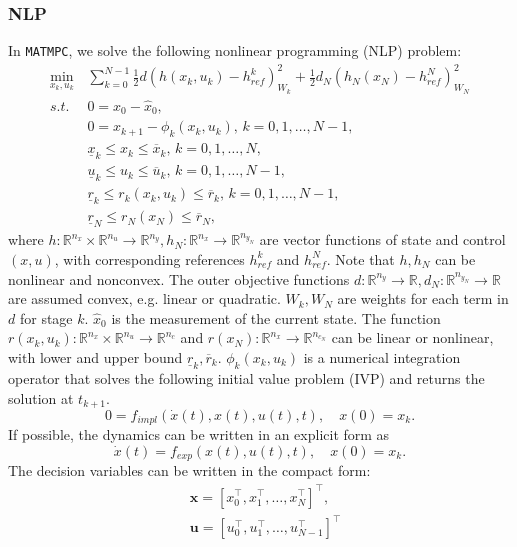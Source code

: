\documentclass{article}
\newcommand{\software}[1]{{\tt#1}}
\begin{document}
\subsubsection{NLP}
In \software{MATMPC}, we solve the following nonlinear programming (NLP) problem:
\begin{equation}\label{NLP}
	\begin{aligned}
	\min_{x_k,u_k} \,&\sum_{k=0}^{N-1} \frac{1}{2}d(h(x_k,u_k)-h_{ref}^k)_{W_k}^2+\frac{1}{2}d_N(h_N(x_N)-h_{ref}^N)_{W_N}^2\\
	s.t.\, &0=x_0-\hat{x}_0,\\
	&0=x_{k+1}-\phi_k(x_k,u_k),\, k=0,1,\ldots,N-1,\\
	&\underline{x}_k\leq x_k\leq \overline{x}_k,\,k=0,1,\ldots,N,\\
	&\underline{u}_k\leq u_k\leq \overline{u}_k,\,k=0,1,\ldots,N-1,\\
	&\underline{r}_k\leq r_k(x_k,u_k)\leq \overline{r}_k, \,k=0,1,\ldots,N-1,\\
	&\underline{r}_N\leq r_N(x_N)\leq \overline{r}_N,
	\end{aligned}
\end{equation}
where $h:\mathbb{R}^{n_x}\times\mathbb{R}^{n_u}\rightarrow \mathbb{R}^{n_y},h_N:\mathbb{R}^{n_x}\rightarrow\mathbb{R}^{n_{y_N}}$ are vector functions of state and control $(x,u)$, with corresponding references $h_{ref}^k$ and $h_{ref}^N$. Note that $h,h_N$ can be nonlinear and nonconvex. The outer objective functions $d:\mathbb{R}^{n_y}\rightarrow \mathbb{R}, d_N:\mathbb{R}^{n_{y_N}}\rightarrow \mathbb{R}$ are assumed convex, e.g. linear or quadratic. $W_k,W_N$ are weights for each term in $d$ for stage $k$. $\hat{x}_0$ is the measurement of the current state. The function $r(x_k,u_k): \mathbb{R}^{n_x}\times\mathbb{R}^{n_u} \rightarrow \mathbb{R}^{n_c}$ and $r(x_N): \mathbb{R}^{n_x}\rightarrow \mathbb{R}^{n_{c_N}}$ can be linear or nonlinear, with lower and upper bound $\underline{r}_k, \overline{r}_k$. $\phi_k(x_k,u_k)$ is a numerical integration operator that solves the following initial value problem (IVP) and returns the solution at $t_{k+1}$.
\begin{equation}
0=f_{impl}(\dot{x}(t), x(t),u(t),t),\quad x(0)=x_k.
\end{equation}
If possible, the dynamics can be written in an explicit form as
\begin{equation}
\dot{x}(t)=f_{exp}(x(t),u(t),t),\quad x(0)=x_k.
\end{equation}
The decision variables can be written in the compact form:
\begin{equation}
\begin{aligned}
&\mathbf{x}= \left [x_0^\top, x_1^\top,\dots, x_N^\top\right ]^\top,\\
&\mathbf{u}= \left [u_0^\top, u_1^\top,\dots, u_{N-1}^\top\right ]^\top
\end{aligned}
\end{equation}
\end{document}
